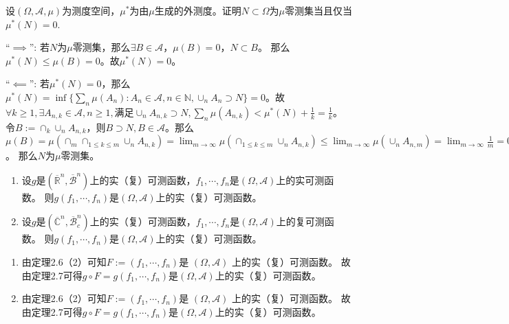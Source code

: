 \documentclass{ctexart}
\begin{document}
\begin{problem}\label{pro:23}
 设\((\Omega,\mathcal{A},\mu) \)为测度空间，\(\mu^* \)为由\(\mu \)生成的外测度。证明\(N \subset \Omega \)为\(\mu  \)零测集当且仅当\(\mu^*(N)=0 \). 
\end{problem}
\begin{solution}
``\(\implies\)'': 若\(N \)为\(\mu \)零测集，那么\(\exists B \in \mathcal{A} \)，\(\mu(B)=0 \)，\(N \subset B \)。
那么\(\mu^*(N) \leq \mu(B)=0 \)。故\(\mu^*(N)=0 \)。 

``\(\impliedby\)'': 若\(\mu^*(N)=0 \)，那么\(\mu^*(N)=\inf\{\sum_{n}\mu(A_n):A_n \in \mathcal{A}, n \in \mathbb{N}, \cup_n A_n \supset N\}=0\)。故\(\forall k  \geq 1, \exists A_{n,k} \in \mathcal{A}, n  \geq 1, \)满足\(\cup_n A_{n,k} \supset N, \sum_{n}\mu(A_{n,k}) < \mu^*(N) + \frac{1}{k}=\frac{1}{k} \)。
令\(B := \cap_k \cup_n A_{n,k} \)，则\(B \supset N, B \in \mathcal{A} \)。那么\(\mu(B)=\mu(\cap_{m} \cap_{ 1 \leq k \leq m} \cup_{n}A_{n,k})=\lim_{m \to \infty}\mu(\cap_{1 \leq k \leq m} \cup_n A_{n,k}) \leq \lim_{m \to \infty} \mu(\cup_n A_{n,m}) = \lim_{m \to \infty} \frac{1}{m} =0  \)。
那么\(N \)为\(\mu \)零测集。
\end{solution}
\begin{problem}\label{pro:2.5.2}
  \begin{enumerate}
    \item   设\(g \)是\((\overline{\mathbb{R}}^n,\overline{\mathcal{B}}^n) \)上的实（复）可测函数，\(f_1,\cdots,f_n \)是\((\Omega,\mathcal{A}) \)上的实可测函数。
      则\(g(f_1,\cdots,f_n) \)是\((\Omega,\mathcal{A}) \)上的实（复）可测函数。
    \item   设\(g \)是\((\overline{\mathbb{C}}^n,\overline{\mathcal{B}}^n_c) \)上的实（复）可测函数，\(f_1,\cdots,f_n \)是\((\Omega,\mathcal{A}) \)上的复可测函数。
      则\(g(f_1,\cdots,f_n) \)是\((\Omega,\mathcal{A}) \)上的实（复）可测函数。
  \end{enumerate}
\end{problem}
\begin{solution}
  \begin{enumerate}
    \item
      由定理2.6（2）可知\(F:=(f_1,\cdots,f_n) \)是{ \((\Omega,\mathcal{A}) \) }上的{实（复）可测函数}。
      故由定理2.7可得\(g \circ F=g(f_1,\cdots,f_n) \)是\((\Omega,\mathcal{A}) \)上的{实（复）可测函数}。
    \item
      由定理2.6（2）可知\(F:=(f_1,\cdots,f_n) \)是{ \((\Omega,\mathcal{A}) \) }上的{实（复）可测函数}。
      故由定理2.7可得\(g \circ F=g(f_1,\cdots,f_n) \)是\((\Omega,\mathcal{A}) \)上的{实（复）可测函数}。
  \end{enumerate}
\end{solution}
\end{document}
